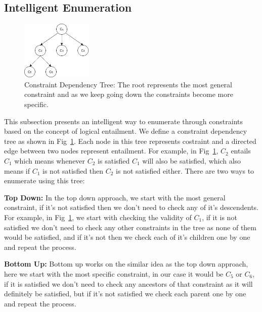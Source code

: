 \documentclass{article}
\begin{document}
\subsection{Intelligent Enumeration}
\begin{figure}[tb]
    \centering
\includegraphics[width=0.3\textwidth]{images/constraintTree.png}
    \caption{\label{fig:constraintTree} Constraint Dependency Tree: The root represents the most general constraint and as we keep going down the constraints become more specific.}
\end{figure}
This subsection presents an intelligent way to enumerate through constraints based on the concept of logical entailment. We define a constraint dependency tree as shown in Fig~\ref{fig:constraintTree}. Each node in this tree represents costraint and a directed edge between two nodes represent entailment. For example, in Fig~\ref{fig:constraintTree}, $C_2$ entails $C_1$ which means whenever $C_2$ is satisfied $C_1$ will also be satisfied, which also means if $C_1$ is not satisfied then $C_2$ is not satisfied either.
There are two ways to enumerate using this tree:
 
\textbf{Top Down:} In the top down approach, we start with the most general constraint, if it's not satisfied then we don't need to check any of it's descendents. For example, in Fig~\ref{fig:constraintTree}, we start with checking the validity of $C_1$, if it is not satisfied we don't need to check any other constraints in the tree as none of them would be satisfied, and if it's not then we check each of it's children one by one and repeat the process.

\textbf{Bottom Up:} Bottom up works on the similar idea as the top down approach, here we start with the most specific constraint, in our case it would be $C_5$ or $C_6$, if it is satisfied we don't need to check any ancestors of that constraint as it will definitely be satisfied, but if it's not satisfied we check each parent one by one and repeat the process.
\end{document}
